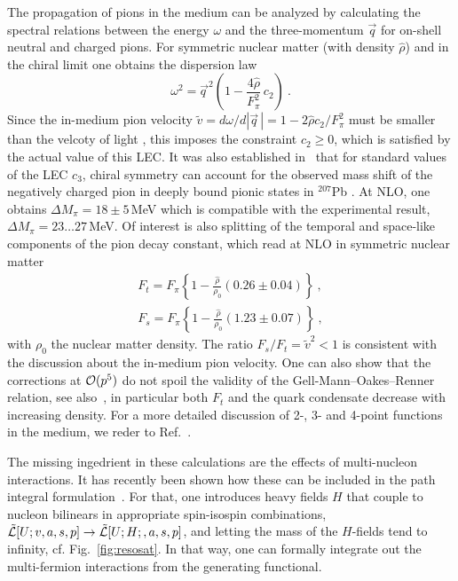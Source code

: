 \documentclass[aps,rmp,nofootinbib,twocolumn,floatfix]{revtex4}
\newcommand{\beq}{\begin{equation}}
\newcommand{\eeq}{\end{equation}}
\newcommand{\beqa}{\begin{eqnarray}}
\newcommand{\eeqa}{\end{eqnarray}}
\begin{document}
The propagation of pions in the medium can be analyzed by calculating
the spectral relations between the energy $\omega$ and the three-momentum
$\vec q$ for on-shell neutral and charged pions. For symmetric nuclear
matter (with density $\hat\rho$) and in the chiral limit one obtains 
the dispersion law
\beq
\omega^2 = \vec{q\,}^2 \left( 1 - \frac{4\hat\rho}{F_\pi^2}\, c_2\right)~.
\eeq
Since the in-medium pion velocity $\tilde v = d\omega / d|\vec{q}\,|=
1-2\hat\rho c_2/F_\pi^2$ must be smaller than the velcoty of light
\cite{Leutwyler:1993gf,Pisarski:1996mt}, this imposes the constraint 
$c_2 \geq 0$, which is satisfied by the actual value of this LEC.
It was also established in~\cite{Meissner:2001gz} that for standard
values of the LEC $c_3$, chiral symmetry can account for the observed
mass shift of the negatively charged pion in deeply bound pionic
states in $^{207}$Pb \cite{Gilg:1999qa,Itahashi:1999qb}. At NLO,
one obtains $\Delta M_\pi = 18\pm 5\,$MeV which is compatible with the
experimental result, $\Delta M_\pi = 23\ldots 27\,$MeV. Of interest 
is also splitting of the temporal and space-like components of the
pion decay constant, which read at NLO in symmetric nuclear matter
\beqa
F_t = F_\pi \left\{ 1 - \frac{\hat\rho}{\rho_0} (0.26\pm 0.04)\right\}~,
\nonumber\\
F_s = F_\pi \left\{ 1 - \frac{\hat\rho}{\rho_0} (1.23\pm 0.07)\right\}~,
\eeqa
with $\rho_0$ the nuclear matter density. The ratio $F_s/F_t = \tilde{v}^2
< 1$ is consistent with the discussion about the in-medium pion
velocity. One can also show that the corrections at ${\cal O}(p^5)$
do not spoil the validity of the Gell-Mann--Oakes--Renner relation,
see also~\cite{Thorsson:1995rj}, in particular both $F_t$ and the quark
condensate decrease with increasing density. For a more detailed
discussion of 2-, 3- and 4-point functions in the medium, we
reder to Ref.~\cite{Meissner:2001gz}.

The missing ingedrient in these calculations are the effects of
multi-nucleon interactions. It has recently been shown how
these can be included in the path integral formulation~\cite{Oller,LMOW}. 
For that, one introduces heavy fields $H$ that couple to nucleon
bilinears in appropriate spin-isospin combinations, 
$\tilde{{\cal L}} [U;v,a,s,p]\to \tilde{{\cal L}} [U;H;,a,s,p]$,
and letting the mass of the $H$-fields tend to infinity, cf. 
Fig.~\ref{fig:resosat}. In that way, one can formally integrate
out the multi-fermion interactions from the generating functional.
\end{document}
